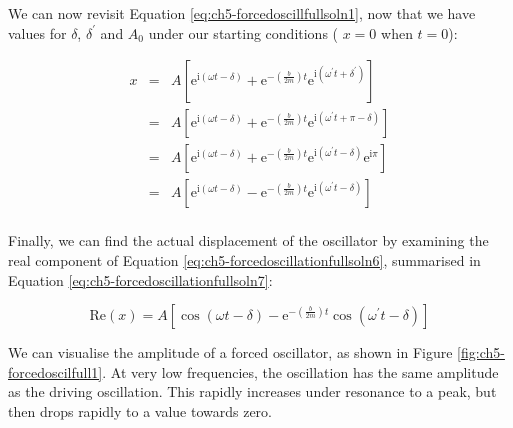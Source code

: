 \documentclass[
]{book}
\begin{document}
We can now revisit Equation \eqref{eq:ch5-forcedoscillfullsoln1}, now that we have values for \(\delta\), \(\delta^\prime\) and \(A_0\) under our starting conditions ( \(x = 0\) when \(t = 0\)):

\begin{equation}
\begin{array}{rcl}
x &= & A \left[ \mathrm{e}^{\mathrm{i}\left(\omega t - \delta \right)}  + \mathrm{e}^{- \left(\frac{b}{2m}\right)t} \mathrm{e}^{\mathrm{i} \left( \omega^\prime t + \delta^\prime \right)} \right]\\

&= & A \left[ \mathrm{e}^{\mathrm{i}\left(\omega t - \delta \right)}  + \mathrm{e}^{- \left(\frac{b}{2m}\right)t} \mathrm{e}^{\mathrm{i} \left( \omega^\prime t + \pi - \delta \right)} \right]\\

&= & A \left[ \mathrm{e}^{\mathrm{i}\left(\omega t - \delta \right)}  + \mathrm{e}^{- \left(\frac{b}{2m}\right)t} \mathrm{e}^{\mathrm{i} \left( \omega^\prime t - \delta \right)} \mathrm{e}^{\mathrm{i} \pi} \right]\\

&= & A \left[ \mathrm{e}^{\mathrm{i}\left(\omega t - \delta \right)}  - \mathrm{e}^{- \left(\frac{b}{2m}\right)t} \mathrm{e}^{\mathrm{i} \left( \omega^\prime t - \delta \right)}  \right]\\

\end{array}
\label{eq:ch5-forcedoscillationfullsoln6}
\end{equation}

Finally, we can find the actual displacement of the oscillator by examining the real component of Equation \eqref{eq:ch5-forcedoscillationfullsoln6}, summarised in Equation \eqref{eq:ch5-forcedoscillationfullsoln7}:

\begin{equation}
\mathrm{Re}(x) = A \left[ \cos (\omega t - \delta) - \mathrm{e}^{- \left(\frac{b}{2m}\right)t} \cos (\omega^\prime t - \delta) \right]
\label{eq:ch5-forcedoscillationfullsoln7}
\end{equation}

We can visualise the amplitude of a forced oscillator, as shown in Figure \ref{fig:ch5-forcedoscilfull1}. At very low frequencies, the oscillation has the same amplitude as the driving oscillation. This rapidly increases under resonance to a peak, but then drops rapidly to a value towards zero.
\end{document}
